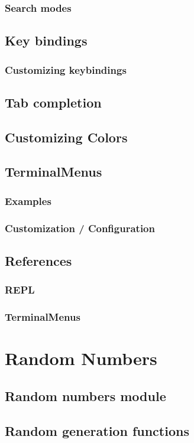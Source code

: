     \subsection{Search modes}
    \section{Key bindings}
    \subsection{Customizing keybindings}
    \section{Tab completion}
    \section{Customizing Colors}
    \section{TerminalMenus}
    \subsection{Examples}
    \subsection{Customization / Configuration}
    \section{References}
    \subsection{REPL}
    \subsection{TerminalMenus}
\chapter{Random Numbers}
    \section{Random numbers module}
    \section{Random generation functions}
